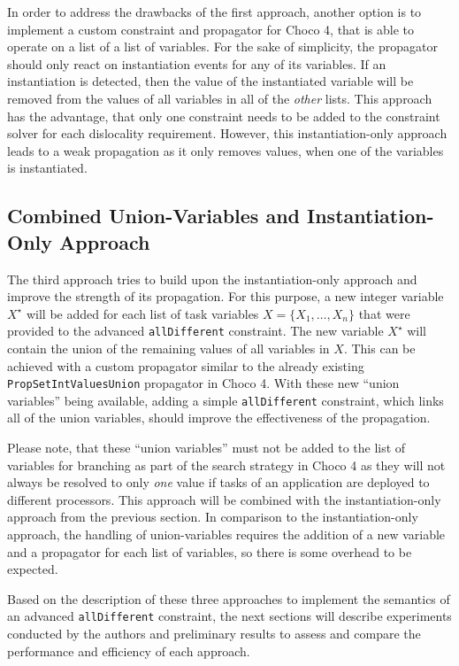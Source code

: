 \documentclass[conference]{IEEEtran}
\begin{document}
In order to address the drawbacks of the first approach, another option is to implement a custom constraint and propagator for Choco 4, that is able to operate on a list of a list of variables.
For the sake of simplicity, the propagator should only react on instantiation events for any of its variables.
If an instantiation is detected, then the value of the instantiated variable will be removed from the values of all variables in all of the \emph{other} lists.
This approach has the advantage, that only one constraint needs to be added to the constraint solver for each dislocality requirement.
However, this instantiation-only approach leads to a weak propagation as it only removes values, when one of the variables is instantiated.

\subsection*{Combined Union-Variables and Instantiation-Only Approach}

The third approach tries to build upon the instantiation-only approach and improve the strength of its propagation.
For this purpose, a new integer variable $X^\star$ will be added for each list of task variables $X = \{X_1, \dots, X_n\}$ that were provided to the advanced \texttt{allDifferent} constraint.
The new variable $X^\star$ will contain the union of the remaining values of all variables in $X$.
This can be achieved with a custom propagator similar to the already existing \texttt{PropSetIntValuesUnion} propagator in Choco 4.
With these new ``union variables'' being available, adding a simple \texttt{allDifferent} constraint, which links all of the union variables, should improve the effectiveness of the propagation.

Please note, that these ``union variables'' must not be added to the list of variables for branching as part of the search strategy in Choco 4 as they will not always be resolved to only \emph{one} value if tasks of an application are deployed to different processors.
This approach will be combined with the instantiation-only approach from the previous section.
In comparison to the instantiation-only approach, the handling of union-variables requires the addition of a new variable and a propagator for each list of variables, so there is some overhead to be expected.

Based on the description of these three approaches to implement the semantics of an advanced \texttt{allDifferent} constraint, the next sections will describe experiments conducted by the authors and preliminary results to assess and compare the performance and efficiency of each approach.
\end{document}
